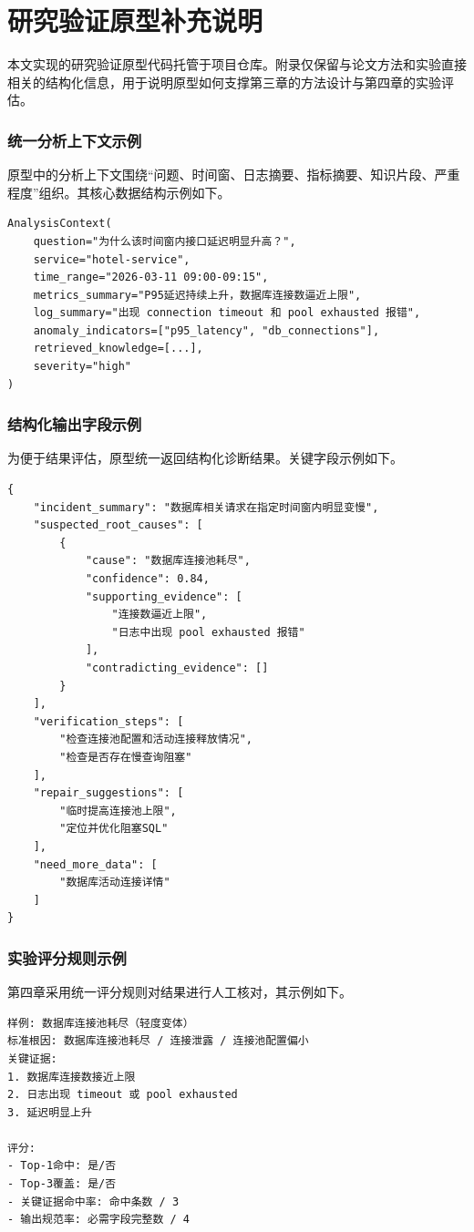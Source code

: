 
\appendix

\chapter{研究验证原型补充说明}

本文实现的研究验证原型代码托管于项目仓库。附录仅保留与论文方法和实验直接相关的结构化信息，用于说明原型如何支撑第三章的方法设计与第四章的实验评估。

\subsection{统一分析上下文示例}

原型中的分析上下文围绕“问题、时间窗、日志摘要、指标摘要、知识片段、严重程度”组织。其核心数据结构示例如下。

\begin{verbatim}
AnalysisContext(
    question="为什么该时间窗内接口延迟明显升高？",
    service="hotel-service",
    time_range="2026-03-11 09:00-09:15",
    metrics_summary="P95延迟持续上升，数据库连接数逼近上限",
    log_summary="出现 connection timeout 和 pool exhausted 报错",
    anomaly_indicators=["p95_latency", "db_connections"],
    retrieved_knowledge=[...],
    severity="high"
)
\end{verbatim}

\subsection{结构化输出字段示例}

为便于结果评估，原型统一返回结构化诊断结果。关键字段示例如下。

\begin{verbatim}
{
    "incident_summary": "数据库相关请求在指定时间窗内明显变慢",
    "suspected_root_causes": [
        {
            "cause": "数据库连接池耗尽",
            "confidence": 0.84,
            "supporting_evidence": [
                "连接数逼近上限",
                "日志中出现 pool exhausted 报错"
            ],
            "contradicting_evidence": []
        }
    ],
    "verification_steps": [
        "检查连接池配置和活动连接释放情况",
        "检查是否存在慢查询阻塞"
    ],
    "repair_suggestions": [
        "临时提高连接池上限",
        "定位并优化阻塞SQL"
    ],
    "need_more_data": [
        "数据库活动连接详情"
    ]
}
\end{verbatim}

\subsection{实验评分规则示例}

第四章采用统一评分规则对结果进行人工核对，其示例如下。

\begin{verbatim}
样例: 数据库连接池耗尽（轻度变体）
标准根因: 数据库连接池耗尽 / 连接泄露 / 连接池配置偏小
关键证据:
1. 数据库连接数接近上限
2. 日志出现 timeout 或 pool exhausted
3. 延迟明显上升

评分:
- Top-1命中: 是/否
- Top-3覆盖: 是/否
- 关键证据命中率: 命中条数 / 3
- 输出规范率: 必需字段完整数 / 4
\end{verbatim}
